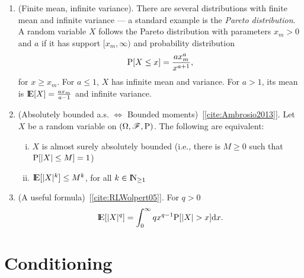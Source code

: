 \documentclass[a4paper,10pt]{scrbook}
\begin{document}
\begin{enumerate}
 \item (Finite mean, infinite variance). There are several distributions with finite mean 
       and infinite variance --- a standard example is the \textit{Pareto distribution}.
       A random variable $X$ follows the Pareto distribution with parameters $x_m>0$ and $a$
       if it has support $[x_m,\infty)$ and probability distribution
       \[
        \mathrm{P}[X\leq x] = \frac{ax_m^a}{x^{a+1}},
       \]
       for $x\geq x_m$. For $a\leq 1$, $X$ has infinite mean and variance. For $a>1$, its
       mean is $\E[X]=\frac{ax_m}{a-1}$ and infinite variance.
       
 \item (Absolutely bounded a.s. $\Leftrightarrow$ Bounded moments)~[\ref{cite:Ambrosio2013}].
	Let $X$ be a random variable on $(\Omega,\mathscr{F},\mathrm{P})$. The following are equivalent:
	\begin{enumerate}[i.]
	  \item $X$ is almost surely absolutely bounded (i.e., there is $M\geq 0$ such that $\mathrm{P}[|X|\leq M]=1$)
	  \item $\E[|X|^k]\leq M^k$, for all $k\in \N_{\geq 1}$
	\end{enumerate}

 \item (A useful formula)~[\ref{cite:RLWolpert05}]. For $q>0$
 \[
  \E[|X|^q] = \int_0^\infty q x^{q-1} \prob[|X|>x]\d x.
 \]	

\end{enumerate}




\section{Conditioning}
\end{document}
